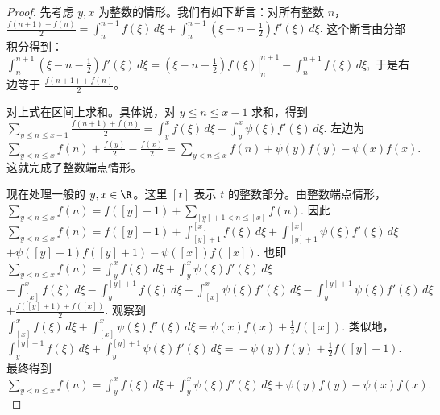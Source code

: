 \begin{proof}
	先考虑 $y,x$ 为整数的情形。我们有如下断言：对所有整数 $n$，
	\(\textstyle \frac{f(n+\allowbreak{}1)+\allowbreak{}f(n)}{2} =\allowbreak{} \int_n^{n+\allowbreak{}1} f(\xi)\,d\xi +\allowbreak{} \int_n^{n+\allowbreak{}1}\left(\xi-n-\frac12\right)f'(\xi)\,d\xi.\)
	这个断言由分部积分得到：
	\(\textstyle \int_n^{n+\allowbreak{}1}\left(\xi-n-\frac12\right)f'(\xi)\,d\xi =\allowbreak{} \left.\left(\xi-n-\frac12\right)f(\xi)\right|_n^{n+\allowbreak{}1} - \int_n^{n+\allowbreak{}1}f(\xi)\,d\xi,\allowbreak{}\)
	于是右边等于 $\frac{f(n+1)+f(n)}2$。

	对上式在区间上求和。具体说，对 $y\leq n\leq x-1$ 求和，得到
	\(\textstyle \sum_{y\leq\allowbreak{} n\leq\allowbreak{} x-1}\frac{f(n+\allowbreak{}1)+\allowbreak{}f(n)}2 =\allowbreak{} \int_y^x f(\xi)\,d\xi +\allowbreak{} \int_y^x\psi(\xi)f'(\xi)\,d\xi.\)
	左边为
	\(\textstyle \sum_{y<n\leq\allowbreak{} x}f(n)+\allowbreak{}\frac{f(y)}2-\frac{f(x)}2 =\allowbreak{} \sum_{y<n\leq\allowbreak{} x}f(n)+\allowbreak{}\psi(y)f(y)-\psi(x)f(x).\)
	这就完成了整数端点情形。

	现在处理一般的 $y,x\in\R$。这里 $[t]$ 表示 $t$ 的整数部分。由整数端点情形，
	\(\textstyle \sum_{y<n\leq\allowbreak{} x}f(n) =\allowbreak{} f([y]+\allowbreak{}1)+\allowbreak{}\sum_{[y]+\allowbreak{}1<n\leq\allowbreak{} [x]}f(n).\)
	因此
	\(\textstyle \sum_{y<n\leq\allowbreak{} x}f(n) =\allowbreak{}{}f([y]+\allowbreak{}1) +\allowbreak{}\int_{[y]+\allowbreak{}1}^{[x]}f(\xi)\,d\xi +\allowbreak{}\int_{[y]+\allowbreak{}1}^{[x]}\psi(\xi)f'(\xi)\,d\xi\) \(\textstyle +\allowbreak{}\psi([y]+\allowbreak{}1)f([y]+\allowbreak{}1)-\psi([x])f([x]).\)
	也即
	\(\textstyle \sum_{y<n\leq\allowbreak{} x}f(n) =\allowbreak{}{} \int_y^x f(\xi)\,d\xi +\allowbreak{}\int_y^x \psi(\xi)f'(\xi)\,d\xi\) \(\textstyle -\int_{[x]}^x f(\xi)\,d\xi -\int_y^{[y]+\allowbreak{}1}f(\xi)\,d\xi -\int_{[x]}^x\psi(\xi)f'(\xi)\,d\xi -\int_y^{[y]+\allowbreak{}1}\psi(\xi)f'(\xi)\,d\xi\) \(\textstyle +\allowbreak{}\frac{f([y]+\allowbreak{}1)+\allowbreak{}f([x])}{2}.\)
	观察到
	\(\textstyle \int_{[x]}^x f(\xi)\,d\xi +\allowbreak{} \int_{[x]}^x\psi(\xi)f'(\xi)\,d\xi =\allowbreak{} \psi(x)f(x)+\allowbreak{}\frac12 f([x]).\)
	类似地，
	\(\textstyle \int_y^{[y]+\allowbreak{}1} f(\xi)\,d\xi +\allowbreak{} \int_y^{[y]+\allowbreak{}1}\psi(\xi)f'(\xi)\,d\xi =\allowbreak{} -\psi(y)f(y)+\allowbreak{}\frac12 f([y]+\allowbreak{}1).\)
	最终得到
	\(\textstyle \sum_{y<n\leq\allowbreak{} x}f(n) =\allowbreak{} \int_y^x f(\xi)\,d\xi +\allowbreak{} \int_y^x \psi(\xi)f'(\xi)\,d\xi +\allowbreak{} \psi(y)f(y)-\psi(x)f(x).\)
\end{proof}

